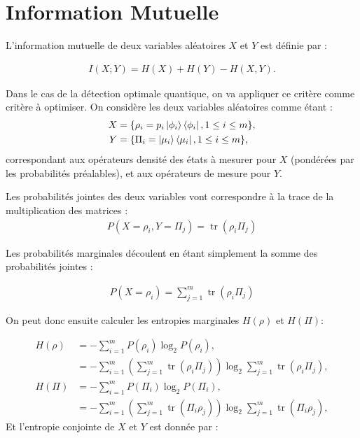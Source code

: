 \documentclass[12pt,a4paper]{article}
\DeclareMathOperator{\tr}{tr}
\begin{document}
    \section*{Information Mutuelle}
\medbreak

    L'information mutuelle de deux variables aléatoires $X$ et $Y$ est définie par :

    \begin{align}
        I(X; Y) = H(X) + H(Y) - H(X,Y).
    \end{align}

    Dans le cas de la détection optimale quantique, on va appliquer ce critère comme critère à optimiser. On considère les deux variables aléatoires comme étant :
    \begin{align*}
        X &= \{ \rho_i = p_i \ket{\phi_i}\bra{\phi_i}, 1 \leq i \leq m\}, \\
        Y &= \{ \Pi_i  = \ket{\mu_i}\bra{\mu_i}, 1 \leq i \leq m\},
    \end{align*}
    correspondant aux opérateurs densité des états à mesurer pour $X$ (pondérées par les probabilités préalables), et aux opérateurs de mesure pour $Y$.

    Les probabilités jointes des deux variables vont correspondre à la trace de la multiplication des matrices :
    \begin{align}
        P(X = \rho_i, Y = \Pi_j) = \tr(\rho_i \Pi_j)
    \end{align}

    Les probabilités marginales découlent en étant simplement la somme des probabilités jointes : 

    \begin{align}
        P(X = \rho_i) = \displaystyle \sum_{j=1}^{m} \tr (\rho_i \Pi_j)
    \end{align}

    On peut donc ensuite calculer les entropies marginales $H(\rho)$ et $H(\Pi)$:

    \begin{align}
        H(\rho) & = - \displaystyle \sum_{i=1}^{m} P(\rho_i) \log_2 P(\rho_i), \nonumber \\
        &= - \displaystyle \sum_{i=1}^{m} \left(\displaystyle \sum_{j=1}^{m} \tr(\rho_i \Pi_j) \right) \log_2 \displaystyle \sum_{j=1}^{m} \tr(\rho_i \Pi_j), \\
        H(\Pi) &= - \displaystyle \sum_{i=1}^{m} P(\Pi_i) \log_2 P(\Pi_i), \nonumber \\
        &= - \displaystyle \sum_{i=1}^{m} \left(\displaystyle \sum_{j=1}^{m} \tr(\Pi_i \rho_j) \right) \log_2 \displaystyle \sum_{j=1}^{m} \tr(\Pi_i \rho_j ),
    \end{align}
    Et l'entropie conjointe de $X$ et $Y$ est donnée par :
\end{document}
